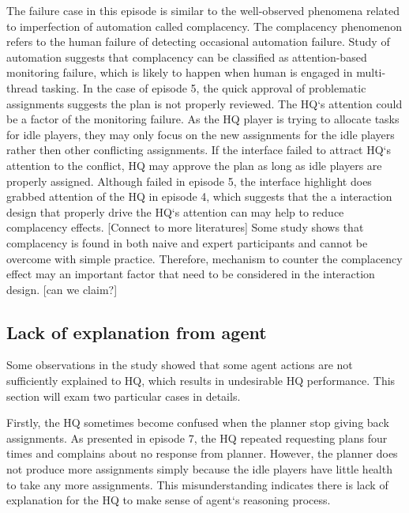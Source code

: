 The failure case in this episode is similar to the well-observed phenomena related to imperfection of automation called complacency. The complacency phenomenon refers to the human failure of detecting occasional automation failure. Study of automation suggests that complacency can be classified as attention-based monitoring failure, which is likely to happen when human is engaged in multi-thread tasking. In the case of episode 5, the quick approval of problematic assignments suggests the plan is not properly reviewed. The HQ`s attention could be a factor of the monitoring failure. As the HQ player is trying to allocate tasks for idle players, they may only focus on the new assignments for the idle players rather then other conflicting assignments.  If the interface failed to attract HQ`s attention to the conflict, HQ may approve the plan as long as idle players are properly assigned. Although failed in episode 5, the interface highlight does grabbed attention of the HQ in episode 4, which suggests that the a interaction design that properly drive the HQ`s attention can may help to reduce complacency effects.  [Connect to more literatures] Some study shows that complacency is found in both naive and expert participants and cannot be overcome with simple practice. Therefore, mechanism to counter the complacency effect may an important factor that need to be considered in the interaction design. [can we claim?]

\subsection{Lack of explanation from agent }
Some observations in the study showed that some agent actions are not sufficiently explained to HQ, which results in undesirable HQ performance. This section will exam two particular cases in details.

Firstly, the HQ sometimes become confused when the planner stop giving back assignments. As presented in episode 7, the HQ repeated requesting plans four times and complains about no response from planner. However, the planner does not produce more assignments simply because the idle players have little health to take any more assignments. This misunderstanding indicates there is lack of explanation for the HQ to make sense of agent`s reasoning process. 

